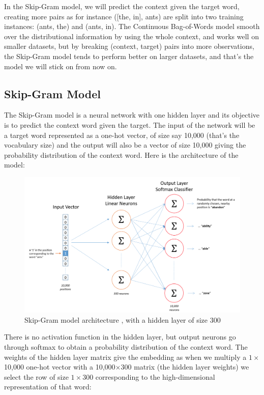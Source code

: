 In the Skip-Gram model, we will predict the context given the target word, creating more pairs as for instance ([the, in], ants) are split into two training instances: (ants, the) and (ants, in). The Continuous Bag-of-Words model smooth over the distributional information by using the whole context, and works well on smaller datasets, but by breaking (context, target) pairs into more observations, the Skip-Gram model tends to perform better on larger datasets, and that's the model we will stick on from now on.

\subsection{Skip-Gram Model}
The Skip-Gram model is a neural network with one hidden layer and its objective is to predict the context word given the target. The input of the network will be a target word represented as a one-hot vector, of size say 10,000 (that's the vocabulary size) and the output will also be a vector of size 10,000 giving the probability distribution of the context word. Here is the architecture of the model:

\begin{figure}[H]
    \centering
    \includegraphics[width=\textwidth]{Images/word2vec-architecture.png}
    \caption{Skip-Gram model architecture \cite{word2vec-architecture}, with a hidden layer of size 300}
\end{figure}

There is no activation function in the hidden layer, but output neurons go through softmax to obtain a probability distribution of the context word. The weights of the hidden layer matrix give the embedding as when we multiply a $1\times$10,000 one-hot vector with a 10,000$\times300$ matrix (the hidden layer weights) we select the row of size $1\times300$ corresponding to the high-dimensional representation of that word:

